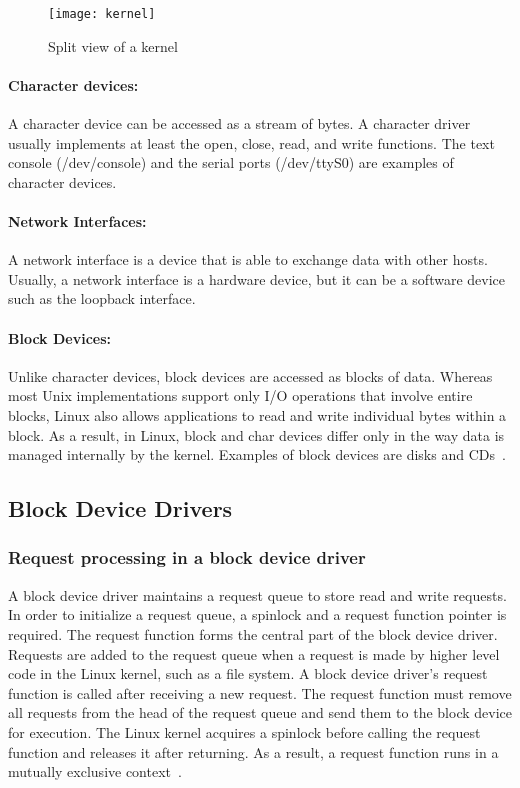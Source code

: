 \begin{figure}[!ht]
\centering
\texttt{[image: kernel]}
\caption{Split view of a kernel}
\label{fig:kernel}
\end{figure}

\paragraph{Character devices:} A character device can be accessed as
a stream of bytes. A character driver usually implements at least the
open, close, read, and write functions. The text console (/dev/console)
and the serial ports (/dev/ttyS0) are examples of character devices.

\paragraph{Network Interfaces:} A network interface is a device that
is able to exchange data with other hosts. Usually, a network interface
is a hardware device, but it can be a software device such as the loopback
interface.

\paragraph{Block Devices:} Unlike character devices, block devices
are accessed as blocks of data. Whereas most Unix implementations
support only I/O operations that involve entire blocks,
Linux also allows applications to read and write individual bytes within
a block. As a result, in Linux, block and char devices
differ only in the way data is managed internally by the kernel. 
Examples of block devices are disks and CDs~\cite{Corbet:2005:LDD:1209083}.

\subsection*{Block Device Drivers}
\subsubsection*{Request processing in a block device driver}

\label{subsec:request queue}
A block device driver maintains a request queue to store read and write
requests. In order to initialize a request queue, a spinlock and a
request function pointer is required.  The request function forms
the central part of the block device driver. Requests are added to
the request queue when a request is made by higher level code in the
Linux kernel, such as a file system. A block device driver's
request function is called after receiving a new request. The request function
must remove all requests from the head of the request queue and send
them to the block device for execution. The Linux kernel acquires a
spinlock before calling the request function and releases it after
returning. As a result, a request function runs in a mutually 
exclusive context~\cite{Corbet:2005:LDD:1209083}.

